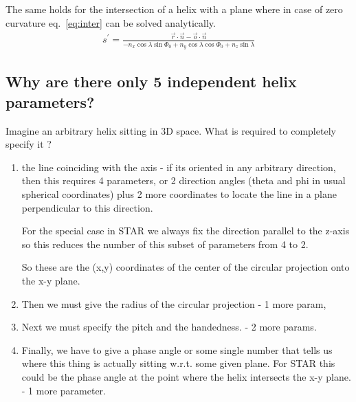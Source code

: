 \documentclass[twoside]{article}
\begin{document}
The same holds for the intersection of a helix with a plane where in case
of zero curvature eq.~\ref{eq:inter} can be solved analytically.
\begin{eqnarray}
s^{\prime} = \frac{ \vec{r} \cdot \vec{n} - \vec{o} \cdot \vec{n} }
                  {- n_x \cos \lambda \sin \Phi_0
                   + n_y \cos \lambda \cos \Phi_0
                   + n_z \sin \lambda}
\end{eqnarray}

\subsection{Why are there only 5 independent helix parameters?}
\label{sec:hparam}
    
    Imagine an arbitrary helix sitting in 3D space.  What is required
    to completely specify it ?
    \begin{enumerate}
    \item the line coinciding with the axis - if its oriented in any arbitrary
        direction, then this requires 4 parameters, or 2 direction angles
        (theta and phi in usual spherical coordinates) plus 2 more coordinates
        to locate the line in a plane perpendicular to this direction.
       
        For the special case in STAR we always fix the direction 
        parallel to the z-axis so this reduces the number of this subset
        of parameters from 4 to 2.

        So these are the (x,y) coordinates of the center of the circular
        projection onto the x-y plane.

    \item Then we must give the radius of the circular projection - 1 more param,
                 
    \item Next we must specify the pitch and the handedness. - 2 more params.

    \item  Finally, we have to give a phase angle or some single number that
        tells us where this thing is actually sitting w.r.t. some given
        plane.  For STAR this could be the phase angle at the point where
        the helix intersects the x-y plane. - 1 more parameter.
        
    \end{enumerate}
\end{document}
